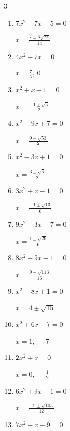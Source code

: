\begin{multicols}{3}
\begin{enumerate}
        $\displaystyle x=\frac{1}{2}, \; -\frac{3}{4}$

  \item $7x^{2}-7x-5=0$

        $\displaystyle x=\frac{7\pm 3\sqrt{21}}{14}$

  \item $4x^{2}-7x=0$

        $\displaystyle x=\frac{7}{4}, \; 0$

  \item $x^{2}+x-1=0$

        $\displaystyle x=\frac{-1\pm \sqrt{5}}{2}$

  \item $x^{2}-9x+7=0$

        $\displaystyle x=\frac{9\pm \sqrt{53}}{2}$

  \item $x^{2}-3x+1=0$

        $\displaystyle x=\frac{3\pm \sqrt{5}}{2}$

\columnbreak %

  \item $3x^{2}+x-1=0$

        $\displaystyle x=\frac{-1\pm \sqrt{13}}{6}$

  \item $9x^{2}-3x-7=0$

        $\displaystyle x=\frac{1\pm \sqrt{29}}{6}$

  \item $8x^{2}-9x-1=0$

        $\displaystyle x=\frac{9\pm \sqrt{113}}{16}$

  \item $x^{2}-8x+1=0$

        $\displaystyle x=4\pm \sqrt{15}$

  \item $x^{2}+6x-7=0$

        $\displaystyle x=1, \; -7$

  \item $2x^{2}+x=0$

        $\displaystyle x=0, \; -\frac{1}{2}$

  \item $6x^{2}+9x-1=0$

        $\displaystyle x=\frac{-9\pm \sqrt{105}}{12}$

\columnbreak %

\resetques

  \item $7x^{2}-x-9=0$


\end{enumerate}
\end{multicols}

